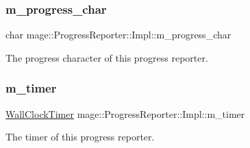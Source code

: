 \subsubsection{\texorpdfstring{m\+\_\+progress\+\_\+char}{m\_progress\_char}}
{\footnotesize\ttfamily char mage\+::\+Progress\+Reporter\+::\+Impl\+::m\+\_\+progress\+\_\+char\hspace{0.3cm}{\ttfamily [private]}}

The progress character of this progress reporter. \mbox{\label{classmage_1_1_progress_reporter_1_1_impl_a8eea94dc2c87abc34d80ad61b5adea2e}} 
\subsubsection{\texorpdfstring{m\+\_\+timer}{m\_timer}}
{\footnotesize\ttfamily \mbox{\hyperlink{namespacemage_a06f4035ef59f07892e594bf1178a108a}{Wall\+Clock\+Timer}} mage\+::\+Progress\+Reporter\+::\+Impl\+::m\+\_\+timer\hspace{0.3cm}{\ttfamily [private]}}

The timer of this progress reporter. 